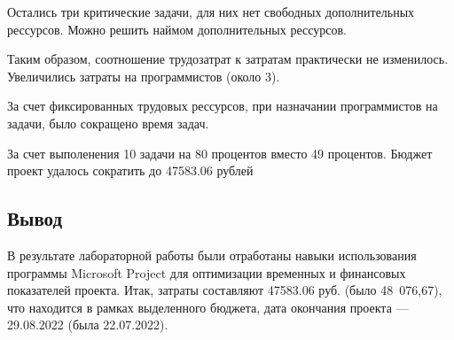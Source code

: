 Остались три критические задачи, для них нет свободных дополнительных рессурсов.
Можно решить наймом дополнительных рессурсов.


Таким образом, соотношение трудозатрат к затратам практически не изменилось. Увеличились затраты на программистов (около 3).

За счет фиксированных трудовых рессурсов, при назначании программистов на задачи, было сокращено время задач.


За счет выполенения 10 задачи на 80 процентов вместо 49 процентов. Бюджет проект удалось сократить до 47583.06 рублей

\subsection*{Вывод}

В результате лабораторной работы были отработаны навыки использования программы Microsoft Project для оптимизации временных и финансовых показателей проекта. 
Итак, затраты составляют 47583.06 руб. (было 48 076,67), что находится в рамках выделенного бюджета, дата окончания проекта –-- 29.08.2022 (была 22.07.2022).
